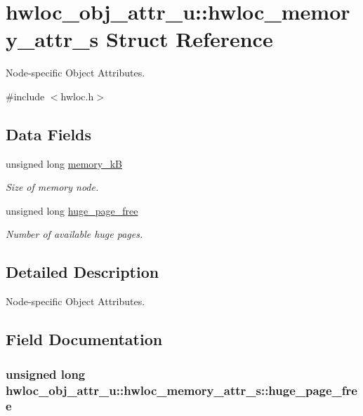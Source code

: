 \hypertarget{structhwloc__obj__attr__u_1_1hwloc__memory__attr__s}{
\section{hwloc\_\-obj\_\-attr\_\-u::hwloc\_\-memory\_\-attr\_\-s Struct Reference}
\label{structhwloc__obj__attr__u_1_1hwloc__memory__attr__s}
}


Node-\/specific Object Attributes.  


{\ttfamily \#include $<$hwloc.h$>$}\subsection*{Data Fields}
\begin{DoxyCompactItemize}
\item 
unsigned long \hyperlink{structhwloc__obj__attr__u_1_1hwloc__memory__attr__s_acf44c5e36f6d156f8a19793715552e71}{memory\_\-kB}
\begin{DoxyCompactList}\small\item\em Size of memory node. \item\end{DoxyCompactList}\item 
unsigned long \hyperlink{structhwloc__obj__attr__u_1_1hwloc__memory__attr__s_a6d0863d71693d53d9ccfb694581efb19}{huge\_\-page\_\-free}
\begin{DoxyCompactList}\small\item\em Number of available huge pages. \item\end{DoxyCompactList}\end{DoxyCompactItemize}


\subsection{Detailed Description}
Node-\/specific Object Attributes. 

\subsection{Field Documentation}
\hypertarget{structhwloc__obj__attr__u_1_1hwloc__memory__attr__s_a6d0863d71693d53d9ccfb694581efb19}{
\subsubsection[{huge\_\-page\_\-free}]{\setlength{\rightskip}{0pt plus 5cm}unsigned long {\bf hwloc\_\-obj\_\-attr\_\-u::hwloc\_\-memory\_\-attr\_\-s::huge\_\-page\_\-free}}}
\label{structhwloc__obj__attr__u_1_1hwloc__memory__attr__s_a6d0863d71693d53d9ccfb694581efb19}



